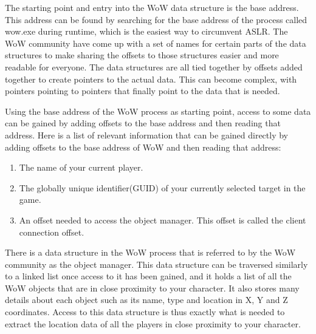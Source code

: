 The starting point and entry into the WoW data structure is the base address. This address can be found by searching for the base address of the process called wow.exe during runtime, which is the easiest way to circumvent ASLR. The WoW community have come up with a set of names for certain parts of the data structures to make sharing the offsets to those structures easier and more readable for everyone. The data structures are all tied together by offsets added together to create pointers to the actual data. This can become complex, with pointers pointing to pointers that finally point to the data that is needed.

Using the base address of the WoW process as starting point, access to some data can be gained by adding offsets to the base address and then reading that address. Here is a list of relevant information that can be gained directly by adding offsets to the base address of WoW and then reading that address:

\begin{enumerate}
	\item The name of your current player.%
	\item The globally unique identifier(GUID) of your currently selected target in the game.%
	\item An offset needed to access the object manager. This offset is called the client connection offset.%
\end{enumerate}


There is a data structure in the WoW process that is referred to by the WoW community as the object manager. This data structure can be traversed similarly to a linked list once access to it has been gained, and it holds a list of all the WoW objects that are in close proximity to your character. It also stores many details about each object such as its name, type and location in X, Y and Z coordinates. Access to this data structure is thus exactly what is needed to extract the location data of all the players in close proximity to your character. 

